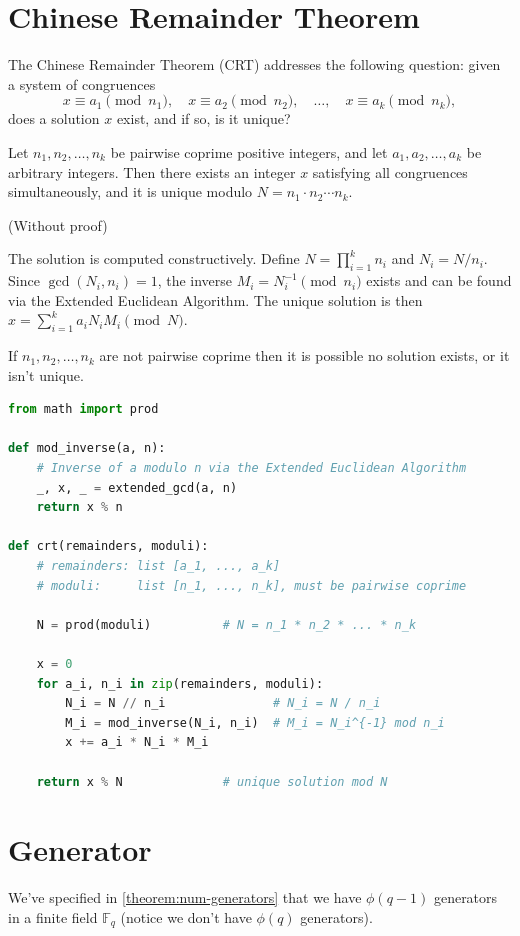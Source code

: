 \section{Chinese Remainder Theorem}
\label{sec:crt}

The Chinese Remainder Theorem (CRT) addresses the following question: given a system of congruences
\[
  x \equiv a_1 \pmod{n_1}, \quad x \equiv a_2 \pmod{n_2}, \quad \ldots, \quad x \equiv a_k \pmod{n_k},
\]
does a solution $x$ exist, and if so, is it unique?

\begin{theorem}
  Let $n_1, n_2, \ldots, n_k$ be pairwise coprime positive integers, and let $a_1, a_2, \ldots, a_k$ be arbitrary integers.
  Then there exists an integer $x$ satisfying all congruences simultaneously, and it is unique modulo $N = n_1 \cdot n_2 \cdots n_k$.
\end{theorem}
(Without proof)

The solution is computed constructively. Define $N = \prod_{i=1}^k n_i$ and $N_i = N / n_i$.
Since $\gcd(N_i, n_i) = 1$, the inverse $M_i = N_i^{-1} \pmod{n_i}$ exists and can be found via the Extended Euclidean Algorithm.
The unique solution is then $x = \sum_{i=1}^k a_i N_i M_i \pmod{N}$.

If $n_1,n_2,\dots,n_k$ are not pairwise coprime then it is possible no solution exists, or it isn't unique. 

\begin{lstlisting}[language=Python, caption={Chinese Remainder Theorem solver}]
from math import prod

def mod_inverse(a, n):
    # Inverse of a modulo n via the Extended Euclidean Algorithm
    _, x, _ = extended_gcd(a, n)  
    return x % n

def crt(remainders, moduli):
    # remainders: list [a_1, ..., a_k]
    # moduli:     list [n_1, ..., n_k], must be pairwise coprime

    N = prod(moduli)          # N = n_1 * n_2 * ... * n_k

    x = 0
    for a_i, n_i in zip(remainders, moduli):
        N_i = N // n_i               # N_i = N / n_i
        M_i = mod_inverse(N_i, n_i)  # M_i = N_i^{-1} mod n_i
        x += a_i * N_i * M_i

    return x % N              # unique solution mod N
\end{lstlisting}

\section{Generator}
We've specified in \autoref{theorem:num-generators} that we have $\phi(q-1)$ generators in a finite field $\mathbb{F}_q$ (notice we don't have $\phi(q)$ generators).

